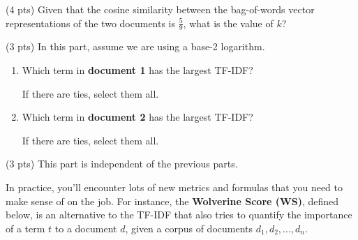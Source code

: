 \documentclass[twoside,12pt]{article}
\begin{document}
\begin{probset}
\begin{prob}[(10 pts)]
\begin{subprobset}

\begin{subprob}(4 pts) Given that the cosine similarity between the bag-of-words vector representations of the two documents is $\displaystyle \frac{5}{9}$, what is the value of $k$?





\end{subprob}

\vspace{0.3in}

\begin{subprob}(3 pts) In this part, assume we are using a base-2 logarithm.

\begin{enumerate}[label=(\roman*)]

\item Which term in \textbf{document 1} has the largest TF-IDF?

If there are ties, select them all.

    

\vspace{0.02in}

\item Which term in \textbf{document 2} has the largest TF-IDF?

If there are ties, select them all.

    

\end{enumerate}

\end{subprob}

\vspace{0.1in}

\begin{subprob}(3 pts) This part is independent of the previous parts.

In practice, you'll encounter lots of new metrics and formulas that you need to make sense of on the job. For instance, the \textbf{Wolverine Score (WS)}, defined below, is an alternative to the TF-IDF that also tries to quantify the importance of a term $t$ to a document $d$, given a corpus of documents $d_1, d_2, ..., d_n$.


\end{subprob}
\end{subprobset}
\end{prob}
\end{probset}
\end{document}

